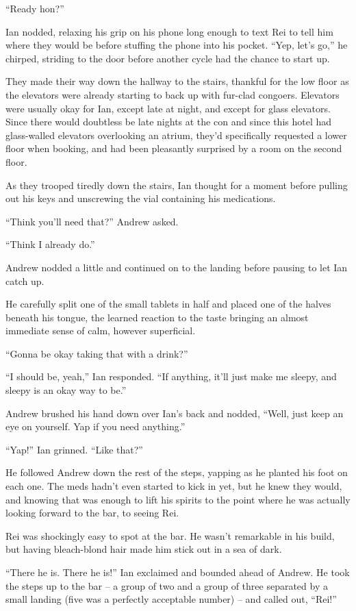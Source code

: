 ``Ready hon?''

Ian nodded, relaxing his grip on his phone long enough to text Rei to tell him where they would be before stuffing the phone into his pocket. ``Yep, let's go,'' he chirped, striding to the door before another cycle had the chance to start up.

They made their way down the hallway to the stairs, thankful for the low floor as the elevators were already starting to back up with fur-clad congoers. Elevators were usually okay for Ian, except late at night, and except for glass elevators. Since there would doubtless be late nights at the con and since this hotel had glass-walled elevators overlooking an atrium, they'd specifically requested a lower floor when booking, and had been pleasantly surprised by a room on the second floor.

As they trooped tiredly down the stairs, Ian thought for a moment before pulling out his keys and unscrewing the vial containing his medications.

``Think you'll need that?'' Andrew asked.

``Think I already do.''

Andrew nodded a little and continued on to the landing before pausing to let Ian catch up.

He carefully split one of the small tablets in half and placed one of the halves beneath his tongue, the learned reaction to the taste bringing an almost immediate sense of calm, however superficial.

``Gonna be okay taking that with a drink?''

``I should be, yeah,'' Ian responded. ``If anything, it'll just make me sleepy, and sleepy is an okay way to be.''

Andrew brushed his hand down over Ian's back and nodded, ``Well, just keep an eye on yourself. Yap if you need anything.''

``Yap!'' Ian grinned.  ``Like that?''

He followed Andrew down the rest of the steps, yapping as he planted his foot on each one. The meds hadn't even started to kick in yet, but he knew they would, and knowing that was enough to lift his spirits to the point where he was actually looking forward to the bar, to seeing Rei.

Rei was shockingly easy to spot at the bar. He wasn't remarkable in his build, but having bleach-blond hair made him stick out in a sea of dark.

``There he is. There he is!'' Ian exclaimed and bounded ahead of Andrew. He took the steps up to the bar -- a group of two and a group of three separated by a small landing (five was a perfectly acceptable number) -- and called out, ``Rei!''

